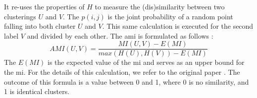 \begin{enumerate}
\begin{equation}
        \end{equation}
        It re-uses the properties of $H$ to measure the (dis)similarity between two clusterings $U$ and $V$.
        The $p(i,j)$ is the joint probability of a random point falling into both cluster $U$ and $V$.
        This same calculation is executed for the second label $V$ and divided by each other.
        The \gls{ami} is formulated as follows \citep{vinh_information_nodate}:
        \begin{equation}
          AMI (U, V)  = \frac{MI(U, V) - E(MI)}{max(H(U), H(V)) - E(MI)}
        \end{equation}
        The $E(MI)$ is the expected value of the \gls{mi} and serves as an upper bound for the \gls{mi}.
        For the details of this calculation, we refer to the original paper \citep{vinh_information_nodate}.
        The outcome of this formula is a value between 0 and 1, where 0 is no similarity, and 1 is identical clusters.
\end{enumerate}
